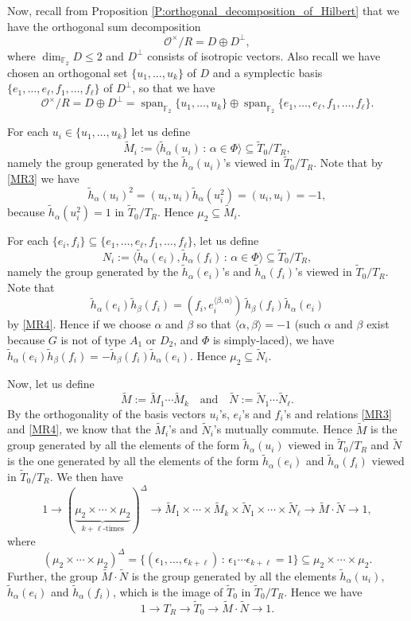 \documentclass[10pt, letterpaper]{amsart}
\theoremstyle{plain}
\theoremstyle{definition}
\numberwithin{equation}{section}
\newcommand{\F}{\mathbb{F}}
\newcommand{\hta}{\tilde{h}_{\alpha}}
\newcommand{\htb}{\tilde{h}_{\beta}}
\newcommand{\Mt}{\widetilde{M}}
\newcommand{\Nt}{\widetilde{N}}
\newcommand{\Tt}{\widetilde{T}}
\newcommand{\Span}{\operatorname{span}}
\newcommand{\Ocal}{\mathcal{O}}
\newcommand{\la}{\langle}
\newcommand{\ra}{\rangle}
\newcommand{\st}{\,:\,}
\newcommand{\qand}{{\quad\text{and}\quad}}
\begin{document}
Now, recall from Proposition \ref{P:orthogonal_decomposition_of_Hilbert} that we have the orthogonal sum decomposition
\[
\Ocal^\times\slash R=D\oplus D^\perp,
\]
where $\dim_{\F_2}D\leq 2$ and $D^\perp$ consists of isotropic vectors. Also recall we have chosen an orthogonal set $\{u_1,\dots, u_k\}$ of $D$ and a symplectic basis $\{e_1,\dots, e_\ell,f_1,\dots,f_\ell\}$ of $D^\perp$, so that we have
\[
\Ocal^\times\slash R=D\oplus D^\perp=\Span_{\F_2}\{u_1,\dots,u_k\}\oplus\Span_{\F_2}\{e_1,\dots,e_\ell, f_1,\dots,f_\ell\}.
\]

For each $u_i\in \{u_1,\dots, u_k\}$ let us define
\[
\Mt_i:=\la \hta(u_i)\st\alpha\in\Phi\ra\subseteq \Tt_{0}\slash T_{R},
\]
namely the group generated by the $\hta(u_i)$'s viewed in $\Tt_{0}\slash T_{R}$. Note that by \eqref{MR3} we have
\[
\hta(u_i)^2=(u_i, u_i)\hta(u_i^2)=(u_i,u_i)=-1,
\]
because $\hta(u_i^2)=1$ in $\Tt_{0}\slash T_{R}$. Hence $\mu_2\subseteq\Mt_i$. 

For each $\{e_i, f_i\}\subseteq \{e_1,\dots, e_\ell,f_1,\dots,f_\ell\}$, let us define
\[
N_i:=\la \hta(e_i),\hta(f_i)\st\alpha\in\Phi\ra\subseteq \Tt_{0}\slash T_{R},
\]
namely the group generated by the $\hta(e_i)$'s and $\hta(f_i)$'s viewed in $\Tt_{0}\slash T_{R}$. Note that
\[
\hta(e_i)\htb(f_i)=(f_i, e_i^{\la\beta, \alpha\ra})\, \htb(f_i)\hta(e_i)
\]
by \eqref{MR4}. Hence if we choose $\alpha$ and $\beta$ so that $\la\alpha, \beta\ra=-1$ (such $\alpha$ and $\beta$ exist because $G$ is not of type $A_1$ or $D_2$, and $\Phi$ is simply-laced), we have $\hta(e_i)\htb(f_i)=-\htb(f_i)\hta(e_i)$. Hence $\mu_2\subseteq\Nt_i$.

Now, let us define
\[
\Mt:=\Mt_1\cdots\Mt_k\qand
\widetilde{N}:=\widetilde{N}_{1}\cdots \widetilde{N}_{\ell}.
\]
By the orthogonality of the basis vectors $u_i$'s, $e_i$'s and $f_i$'s and relations \eqref{MR3} and \eqref{MR4}, we know that the $\Mt_i$'s and $\Nt_i$'s mutually commute. Hence $\Mt$ is the group generated by all the elements of the form $\hta(u_i)$ viewed in $\Tt_{0}\slash T_{R}$ and $\Nt$ is the one generated by all the elements of the form $\hta(e_i)$ and $\hta(f_i)$ viewed in $\Tt_{0}\slash T_{R}$. We then have
\begin{equation}\label{E:exact_sequence_Mt}
1\longrightarrow(\underbrace{\mu_2\times\cdots\times\mu_2}_{\text{$k+\ell$-times}})^{\Delta}\longrightarrow\Mt_1\times\cdots\times\Mt_k\times \Nt_1\times\cdots\times\Nt_{\ell}\longrightarrow\Mt\cdot \Nt\longrightarrow 1,
\end{equation}
where
\[
(\mu_2\times\cdots\times\mu_2)^{\Delta}=\{(\epsilon_1,\dots,\epsilon_{k+\ell})\st \epsilon_1\cdots\epsilon_{k+\ell}=1\}\subseteq \mu_2\times\cdots\times\mu_2.
\]
Further, the group $\Mt\cdot\Nt$ is the group generated by all the elements $\hta(u_i)$, $\hta(e_i)$ and $\hta(f_i)$, which is the image of $\Tt_{0}$ in $\Tt_{0}\slash T_{R}$. Hence we have
\begin{equation}\label{E:exact_sequence_Tt}
1\longrightarrow T_{R}\longrightarrow\Tt_{0}\longrightarrow \Mt\cdot \widetilde{N}\longrightarrow 1.
\end{equation}
\end{document}
